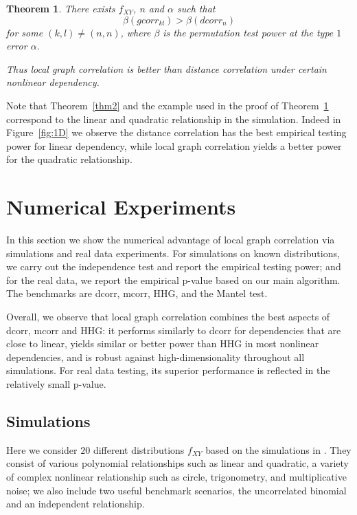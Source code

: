 \documentclass[11pt]{article}
\newtheorem{thm}{Theorem}
\begin{document}
\begin{thm}
\label{thm3}
There exists $f_{XY}$, $n$ and $\alpha$ such that 
\begin{equation}
\label{equ2}
\beta(gcorr_{kl}) > \beta(dcorr_{n})
\end{equation}
for some $(k,l) \neq (n,n)$, where $\beta$ is the permutation test power at the type $1$ error $\alpha$.

Thus local graph correlation is better than distance correlation under certain nonlinear dependency.
\end{thm}
Note that Theorem~\ref{thm2} and the example used in the proof of Theorem~\ref{thm3} correspond to the linear and quadratic relationship in the simulation. Indeed in Figure~\ref{fig:1D} we observe the distance correlation has the best empirical testing power for linear dependency, while local graph correlation yields a better power for the quadratic relationship.

\section{Numerical Experiments}
\label{numer}
In this section we show the numerical advantage of local graph correlation via simulations and real data experiments. For simulations on known distributions, we carry out the independence test and report the empirical testing power; and for the real data, we report the empirical p-value based on our main algorithm. The benchmarks are dcorr, mcorr, HHG, and the Mantel test. 

Overall, we observe that local graph correlation combines the best aspects of dcorr, mcorr and HHG: it performs similarly to dcorr for dependencies that are close to linear, yields similar or better power than HHG in most nonlinear dependencies, and is robust against high-dimensionality throughout all simulations. For real data testing, its superior performance is reflected in the relatively small p-value.

\subsection{Simulations}
\label{numer1}
Here we consider $20$ different distributions $f_{XY}$ based on the simulations in \cite{SzekelyRizzoBakirov2007, SimonTibshirani2012, GorfineHellerHeller2012, HellerGorfine2013}. They consist of various polynomial relationships such as linear and quadratic, a variety of complex nonlinear relationship such as circle, trigonometry, and multiplicative noise; we also include two useful benchmark scenarios, the uncorrelated binomial and an independent relationship. 
\end{document}
